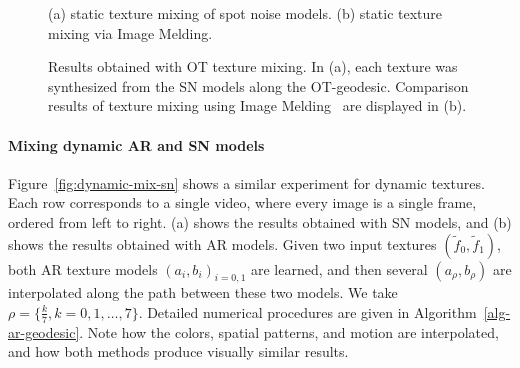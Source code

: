 \begin{figure}[ht!]
  \begin{center}
	(a) static texture mixing of spot noise models.
	(b) static texture mixing via Image Melding.
  	\end{center}
  \caption{Results obtained with OT texture mixing. In (a), each texture was synthesized from the SN models along the OT-geodesic. Comparison results of texture mixing using Image Melding~\cite{ImageMelding12} are displayed in (b).
  }
  \label{fig-OT-mixing-static}
\end{figure}


\paragraph{Mixing dynamic AR and SN  models}
Figure~\ref{fig:dynamic-mix-sn} shows a similar experiment for dynamic textures.
Each row corresponds to a single video, where every image is a single frame, ordered from left to right.
(a) shows the results obtained with SN models, and (b) shows the results obtained with AR models. Given two input textures $(\tilde f_0, \tilde f_1 )$, both AR texture models $(a_i, b_i)_{i=0,1}$ are learned, and then several $(a_{\rho}, b_{\rho})$ are interpolated along the path between these two models. We take $ \rho=\{ \frac{k}{7}, k=0,1,\ldots, 7 \}$. Detailed numerical procedures are given in Algorithm~\ref{alg-ar-geodesic}.
Note how the colors, spatial patterns, and motion are interpolated, and how both methods produce visually similar results.


